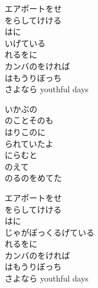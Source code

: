 \documentclass[10pt,b5j]{tarticle} %
\begin{document}
\vspace{1.5em} %
\newcommand{\linespace}{0.5em} %
\newcommand{\blocksize}{0.5\hsize} %
\begin{enumerate} %
    \begin{minipage}[c]{\blocksize}
    
        \vspace{\linespace}
        \item
        エアポートをせ\\
        をらしてけける\\
        はに\\
        いげている\\
        れるをに\\
        カンバのをければ\\
        はもうりぼっち\\
        さよなら youthful days
        
        \vspace{\linespace}
        \item
        いかぶの\\
        のことそのも\\
        はりこのに\\
        られていたよ\\
        にらむと\\
        のえて\\
        のるのをめてた
        
        \vspace{\linespace}
        \item
        エアポートをせ\\
        をらしてけける\\
        はに\\
        じゃがぽっくるげている\\
        れるをに\\
        カンバのをければ\\
        はもうりぼっち\\
        さよなら youthful days
        

\end{minipage}
\end{enumerate}
\end{document}
